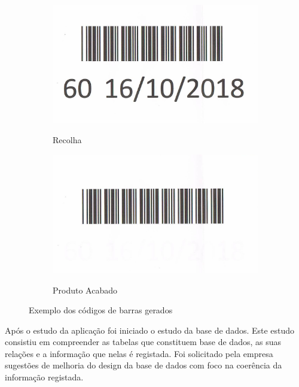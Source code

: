 \begin{figure}[H]
	\centering
	
	\begin{subfigure}[t]{0.4\linewidth}
		\includegraphics[width=\linewidth]{figuras/AppAccess/2-CodBarras.jpg}
		\label{fig:app_access_cb_recolha}
		\caption{Recolha}
	\end{subfigure}
	\begin{subfigure}[t]{0.4\linewidth}
		\includegraphics[width=\linewidth]{figuras/AppAccess/5-CodBarras.jpg}
		\label{fig:app_access_cb_prod_acabado}
		\caption{Produto Acabado}
	\end{subfigure}
	
	\caption{Exemplo dos códigos de barras gerados}
	\label{fig:app_access_cb}
\end{figure}

Após o estudo da aplicação foi iniciado o estudo da base de dados. Este estudo consistiu em compreender as tabelas que constituem base de dados, as suas relações e a informação que nelas é registada. Foi solicitado pela empresa sugestões de melhoria do design da base de dados com foco na coerência da informação registada.

